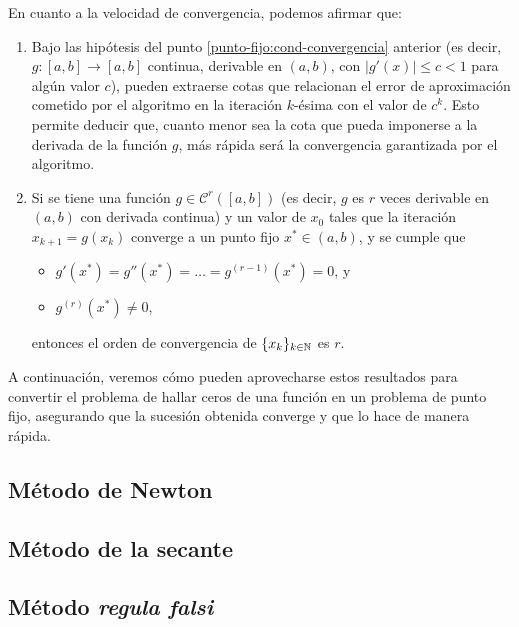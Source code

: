 En cuanto a la velocidad de convergencia, podemos afirmar que:

\begin{enumerate}[label=(\roman*),resume]
\item Bajo las hipótesis del punto \ref{punto-fijo:cond-convergencia}
    anterior (es decir, $g:[a,b] \to [a,b]$ continua, derivable en $(a,b)$,
    con $\lvert g'(x) \rvert \leq c < 1$ para algún valor $c$), pueden
    extraerse cotas que relacionan el error de aproximación cometido por el
    algoritmo en la iteración $k$-ésima con el valor de $c^k$. Esto permite
    deducir que, cuanto menor sea la cota que pueda imponerse a la derivada de
    la función $g$, más rápida será la convergencia garantizada por el
    algoritmo.

\item Si se tiene una función $g \in \mathcal{C}^r([a,b])$ (es decir, $g$ es
    $r$ veces derivable en $(a,b)$ con derivada continua) y un valor de $x_0$
    tales que la iteración $x_{k+1} = g(x_k)$ converge a un punto fijo $x^\ast
    \in (a,b)$, y se cumple que
    \begin{itemize}
    \item $g'(x^\ast) = g''(x^\ast) = \dots = g^{(r-1)}(x^\ast) = 0$, y
    \item $g^{(r)}(x^\ast) \neq 0$,
    \end{itemize}
    entonces el orden de convergencia de $\lbrace x_k \rbrace_{k \in \mathbb{N}}$
    es $r$.
\end{enumerate}

A continuación, veremos cómo pueden aprovecharse estos resultados para
convertir el problema de hallar ceros de una función en un problema de punto
fijo, asegurando que la sucesión obtenida converge y que lo hace de manera
rápida.

\subsection{Método de Newton}



\subsection{Método de la secante}
\subsection{Método \emph{regula falsi}}
